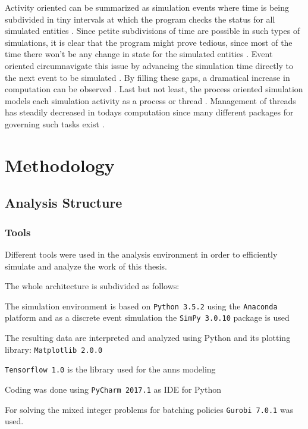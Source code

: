 \documentclass{seal_thesis}
\begin{document}
Activity oriented can be summarized as simulation events where time is being subdivided in tiny intervals at which the program checks the status for all simulated entities \cite{Matloff2008}. Since petite subdivisions of time are possible in such types of simulations, it is clear that the program might prove tedious, since most of the time there won't be any change in state for the simulated entities \cite{Matloff2008}. Event oriented circumnavigate this issue by advancing the simulation time directly to the next event to be simulated \cite{Matloff2008}. By filling these gaps, a dramatical increase in computation can be observed \cite{Matloff2008}. Last but not least, the process oriented simulation models each simulation activity as a process or thread \cite{Matloff2008}. Management of threads has steadily decreased in todays computation since many different packages for governing such tasks exist \cite{Matloff2008}.

\chapter{Methodology}
\label{ch:methodology}

\section{Analysis Structure}
\subsection{Tools}
Different tools were used in the analysis environment in order to efficiently simulate and analyze the work of this thesis.

The whole architecture is subdivided as follows:
\begin{enumerate*}
	\item The simulation environment is based on \texttt{Python 3.5.2} using the \texttt{Anaconda} platform and as a discrete event simulation the \texttt{SimPy 3.0.10} package is used
	\item The resulting data are interpreted and analyzed using Python and its plotting library: \texttt{Matplotlib 2.0.0}
	\item \texttt{Tensorflow 1.0} is the library used for the \glspl{ann} modeling
	\item Coding was done using \texttt{PyCharm 2017.1} as IDE for Python
	\item For solving the mixed integer problems for batching policies \texttt{Gurobi 7.0.1} was used.
\end{enumerate*}
\end{document}
